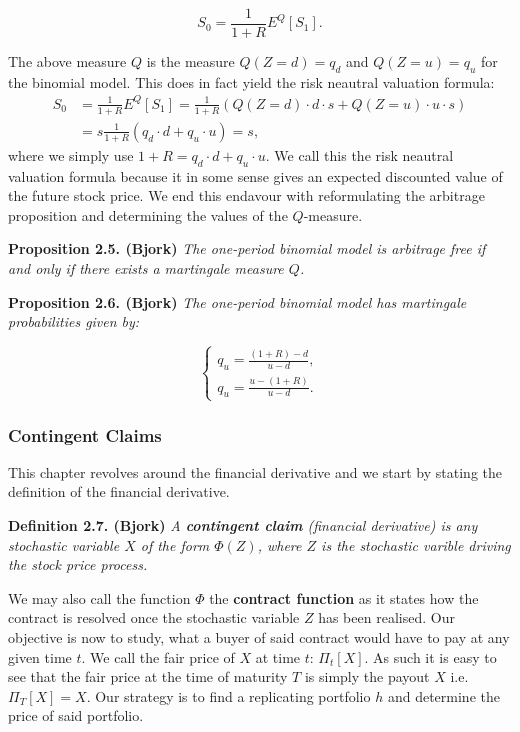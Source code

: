 \documentclass[
]{book}
\begin{document}
\[S_0=\frac{1}{1+R}E^Q[S_1].\]

The above measure \(Q\) is the measure \(Q(Z=d)=q_d\) and \(Q(Z=u)=q_u\) for the binomial model. This does in fact yield the risk neautral valuation formula:
\begin{align*}
S_0&=\frac{1}{1+R}E^Q[S_1]=\frac{1}{1+R}(Q(Z=d)\cdot d\cdot s+Q(Z=u)\cdot u\cdot s)\\
&=s\frac{1}{1+R}(q_d\cdot d+q_u\cdot u)=s,
\end{align*}
where we simply use \(1+R=q_d\cdot d+q_u\cdot u\). We call this the risk neautral valuation formula because it in some sense gives an expected discounted value of the future stock price. We end this endavour with reformulating the arbitrage proposition and determining the values of the \(Q\)-measure.

\textbf{Proposition 2.5. (Bjork)} \emph{The one-period binomial model is arbitrage free if and only if there exists a martingale measure \(Q\).}

\textbf{Proposition 2.6. (Bjork)} \emph{The one-period binomial model has martingale probabilities given by:}

\[\left\{\begin{matrix}q_u=\frac{(1+R)-d}{u-d},\\ q_u=\frac{u-(1+R)}{u-d}.\end{matrix}\right.\]

\hypertarget{contingent-claims}{%
\subsubsection{Contingent Claims}\label{contingent-claims}}

This chapter revolves around the financial derivative and we start by stating the definition of the financial derivative.

\textbf{Definition 2.7. (Bjork)} \emph{A \textbf{contingent claim} (financial derivative) is \emph{any} stochastic variable \(X\) of the form \(\Phi(Z)\), where \(Z\) is the stochastic varible driving the stock price process.}

We may also call the function \(\Phi\) the \textbf{contract function} as it states how the contract is resolved once the stochastic variable \(Z\) has been realised. Our objective is now to study, what a buyer of said contract would have to pay at any given time \(t\). We call the fair price of \(X\) at time \(t\): \(\Pi_t[X]\). As such it is easy to see that the fair price at the time of maturity \(T\) is simply the payout \(X\) i.e.~\(\Pi_T[X]=X\). Our strategy is to find a replicating portfolio \(h\) and determine the price of said portfolio.
\end{document}
